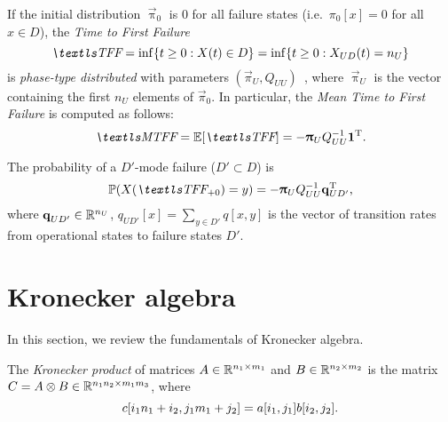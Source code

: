If the initial distribution $\vec{\uppi}_0$ is $0$ for all failure
states (i.e.~$\pi_0[x] = 0$ for all $x \in D$), the \emph{Time
  to First Failure}
\begin{equation}
  \TFF = \inf \{ t \ge 0 : X(t) \in D \} = \inf \{ t \ge 0 : X_{UD}(t)
  = n_U \}
\end{equation}
is \emph{phase-type distributed} with parameters
$(\vec{\pi}_{U}, Q_{UU})$~\citep{NEUT75}, where $\vec{\uppi}_U$ is the
vector containing the first $n_U$ elements of $\vec{\pi}_0$. In
particular, the \emph{Mean Time to First Failure} is computed as follows:
\begin{equation}
  \label{eq:background:mtff}
  \MTFF = \Ex[\TFF] = - \vec{\uppi}_U Q_{UU}^{-1} \vec{1}^\T \text.
\end{equation}

\noindent
The probability of a $D'$-mode failure ($D' \subset D$) is
\begin{equation}
  \label{eq:background:failure-mode}
  \Pr(X(\TFF_{+ 0}) = y) = - \vec{\uppi}_UQ_{UU}^{-1} \vec{q}_{UD'}^\T \text,
\end{equation}
where $\bm{\mathrm{q}}_{UD'} \in \mathbb{R}^{n_U}$,
$q_{UD'}[x] = \sum_{y \in D'} q[x, y]$ is the vector of transition
rates from operational states to failure states $D'$.

\section{Kronecker algebra}

In this section, we review the fundamentals of Kronecker algebra.

\begin{dfn}
  The \emph{Kronecker product} of matrices
  $A \in \mathbb{R}^{n_1 \times m_1}$ and $B \in \mathbb{R}^{n_2 \times m_2}$ is the
  matrix $C = A \otimes B \in \mathbb{R}^{n_1 n_2 \times m_1 m_3}$, where
  \begin{equation}
    c[i_1 n_1 + i_2, j_1 m_1 + j_2] = a[i_1, j_1] b[i_2, j_2] \text.
  \end{equation}
\end{dfn}

